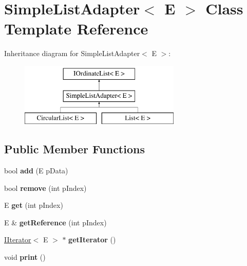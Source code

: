\hypertarget{class_simple_list_adapter}{\section{Simple\-List\-Adapter$<$ E $>$ Class Template Reference}
\label{class_simple_list_adapter}
}
Inheritance diagram for Simple\-List\-Adapter$<$ E $>$\-:\begin{figure}[H]
\begin{center}
\leavevmode
\includegraphics[height=3.000000cm]{class_simple_list_adapter}
\end{center}
\end{figure}
\subsection*{Public Member Functions}
\begin{DoxyCompactItemize}
\item 
\hypertarget{class_simple_list_adapter_a659e4b834a3d5dc46e25665c7809a3d8}{bool {\bfseries add} (E p\-Data)}\label{class_simple_list_adapter_a659e4b834a3d5dc46e25665c7809a3d8}

\item 
\hypertarget{class_simple_list_adapter_a459ccf5fdce99a9b6dade7d187fb2e8d}{bool {\bfseries remove} (int p\-Index)}\label{class_simple_list_adapter_a459ccf5fdce99a9b6dade7d187fb2e8d}

\item 
\hypertarget{class_simple_list_adapter_a0dd35a961e4c7311cb82c11782340667}{E {\bfseries get} (int p\-Index)}\label{class_simple_list_adapter_a0dd35a961e4c7311cb82c11782340667}

\item 
\hypertarget{class_simple_list_adapter_aa548a9578aa7288205982062834e00e9}{E \& {\bfseries get\-Reference} (int p\-Index)}\label{class_simple_list_adapter_aa548a9578aa7288205982062834e00e9}

\item 
\hypertarget{class_simple_list_adapter_a32e8dd965e56d402fe5b450ecc7c7d3c}{\hyperlink{class_i_iterator}{I\-Iterator}$<$ E $>$ $\ast$ {\bfseries get\-Iterator} ()}\label{class_simple_list_adapter_a32e8dd965e56d402fe5b450ecc7c7d3c}

\item 
\hypertarget{class_simple_list_adapter_ae2e5fe821e64b93c93eeda590d31f5f2}{void {\bfseries print} ()}\label{class_simple_list_adapter_ae2e5fe821e64b93c93eeda590d31f5f2}

\end{DoxyCompactItemize}

